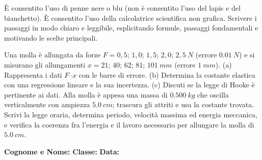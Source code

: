 \documentclass[a4paper,10pt]{exam}
\begin{document}
\begin{tcolorbox}[istruzionibox]
È consentito l'uso di penne nere o blu (non è consentito l'uso del lapis e del bianchetto).
È consentito l'uso della calcolatrice scientifica non grafica.
Scrivere i passaggi in modo chiaro e leggibile, esplicitando formule, passaggi fondamentali e motivando le scelte principali.
\end{tcolorbox}

\vspace{1.5mm}


\begin{questions}
\question Una molla è allungata da forze $F=0{,}5;\,1{,}0;\,1{,}5;\,2{,}0;\,2{,}5\ \si{N}$ (errore $\SI{0.01}{N}$) e si misurano gli allungamenti $x=21;\,40;\,62;\,81;\,101\ \si{mm}$ (errore $\SI{1}{mm}$). (a) Rappresenta i dati $F$--$x$ con le barre di errore. (b) Determina la costante elastica con una regressione lineare e la sua incertezza. (c) Discuti se la legge di Hooke è pertinente ai dati.
\question Alla molla è appesa una massa di $\SI{0.500}{kg}$ che oscilla verticalmente con ampiezza $\SI{5.0}{cm}$; trascura gli attriti e usa la costante trovata. Scrivi la legge oraria, determina periodo, velocità massima ed energia meccanica, e verifica la coerenza fra l'energia e il lavoro necessario per allungare la molla di $\SI{5.0}{cm}$.
\end{questions}
\null
\vfill

\noindent
\textbf{Cognome e Nome:}\enspace\hrulefill\hspace{1cm}%
\textbf{Classe:}\enspace\makebox[2.5cm]{\hrulefill}\hspace{1cm}%
\textbf{Data:}\enspace\makebox[2.5cm]{\hrulefill}

\vspace{3mm}
\end{document}
